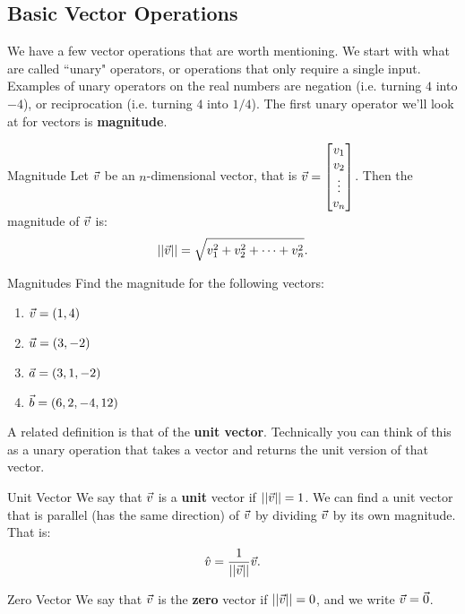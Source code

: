\subsection{Basic Vector Operations}
We have a few vector operations that are worth mentioning. We start with what are called ``unary" operators, or operations that only require a single input. Examples of unary operators on the real numbers are negation (i.e. turning $4$ into $-4$), or reciprocation (i.e. turning $4$ into $1/4$). The first unary operator we'll look at for vectors is \textbf{magnitude}.

\begin{definition}{Magnitude}
Let $\vec{v}$ be an $n$-dimensional vector, that is $\vec{v}=\begin{bmatrix}v_1\\v_2\\ \vdots \\ v_n\end{bmatrix}$. Then the magnitude of $\vec{v}$ is: $$||\vec{v}||=\sqrt{v_1^2+v_2^2+\cdots+v_n^2}. $$
\end{definition}

\begin{exercise}{Magnitudes}
Find the magnitude for the following vectors:
\begin{enumerate}
\item $\vec{v}=(1,4)$
\vspace{1em}
\item $\vec{u}=(3,-2)$
\vspace{1em}
\item $\vec{a}=(3,1,-2)$
\vspace{1em}
\item $\vec{b}=(6,2,-4,12)$
\end{enumerate}
\end{exercise}

A related definition is that of the \textbf{unit vector}. Technically you can think of this as a unary operation that takes a vector and returns the unit version of that vector.

\begin{definition}{Unit Vector}
We say that $\vec{v}$ is a \textbf{unit} vector if $||\vec{v}||=1$. We can find a unit vector that is parallel (has the same direction) of $\vec{v}$ by dividing $\vec{v}$ by its own magnitude. That is: $$\hat{v}=\frac{1}{||\vec{v}||}\vec{v}.$$
\end{definition}

\begin{definition}{Zero Vector}
We say that $\vec{v}$ is the \textbf{zero} vector if $||\vec{v}||=0$, and we write $\vec{v}=\vec{0}$.
\end{definition}

